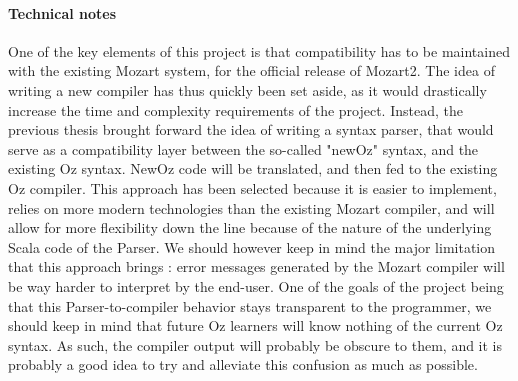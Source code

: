\paragraph{Technical notes}
One of the key elements of this project is that compatibility has to be maintained with the existing Mozart system, for the official release of Mozart2.
The idea of writing a new compiler has thus quickly been set aside, as it would drastically increase the time and complexity requirements of the project.
Instead, the previous thesis brought forward the idea of writing a syntax parser, that would serve as a compatibility layer between the so-called "newOz" syntax, and the existing Oz syntax.\cite{jpthesis}
NewOz code will be translated, and then fed to the existing Oz compiler.\newline
This approach has been selected because it is easier to implement, relies on more modern technologies than the existing Mozart compiler, and will allow for more flexibility down the line because of the nature of the underlying Scala code of the Parser.
We should however keep in mind the major limitation that this approach brings : error messages generated by the Mozart compiler will be way harder to interpret by the end-user.
One of the goals of the project being that this Parser-to-compiler behavior stays transparent to the programmer, we should keep in mind that future Oz learners will know nothing of the current Oz syntax.
As such, the compiler output will probably be obscure to them, and it is probably a good idea to try and alleviate this confusion as much as possible.